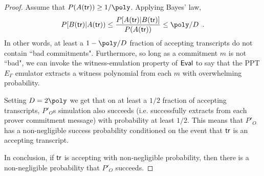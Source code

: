 \begin{proof}
Assume that $P(A(\tr)) \geq 1/\poly$. Applying Bayes' law, %
\[ P[B(\tr) | A(\tr)) \leq \frac{ P[A(\tr) | B(\tr)] }{ P(A(\tr)) } \leq \poly / D \enspace . \]
In other words, at least a $1 - \poly/D$ fraction of accepting transcripts do not contain ``bad commitments". %
Furthermore, so long as a commitment $m$ is not ``bad", we can invoke the witness-emulation property of $\textsf{{Eval}}$ to say that the PPT $E_\Gamma$ emulator extracts a witness polynomial from each $m$ with overwhelming probability.


Setting $D = 2 \poly$ we get that on at least a $1/2$ fraction of accepting transcripts, $P'_O$s simulation also succeeds (i.e. successfully extracts from each prover commitment message) with probability at least $1/2$. This means that $P'_O$ has a non-negligible success probability conditioned on the event that $\textsf{{tr}}$ is an accepting transcript. 

In conclusion, if $\textsf{{tr}}$ is accepting with non-negligible probability, then there is a non-negligible probability that $P'_O$ succeeds. 
\end{proof}


%




